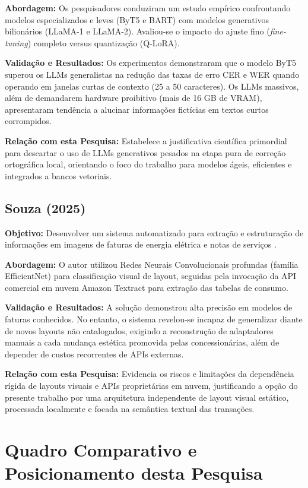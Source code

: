 \documentclass[
	12pt,				
	openright,			
	oneside,			
	a4paper,			
	english,			
	brazil				
	]{abntex2}
\begin{document}
\textbf{Abordagem:} Os pesquisadores conduziram um estudo empírico confrontando modelos especializados e leves (ByT5 e BART) \cite{xue2021byt5, lewis2020bart} com modelos generativos bilionários (LLaMA-1 e LLaMA-2). Avaliou-se o impacto do ajuste fino (\textit{fine-tuning}) completo versus quantização (Q-LoRA).

\textbf{Validação e Resultados:} Os experimentos demonstraram que o modelo ByT5 superou os LLMs generalistas na redução das taxas de erro CER e WER quando operando em janelas curtas de contexto (25 a 50 caracteres). Os LLMs massivos, além de demandarem hardware proibitivo (mais de 16 GB de VRAM), apresentaram tendência a alucinar informações fictícias em textos curtos corrompidos.

\textbf{Relação com esta Pesquisa:} Estabelece a justificativa científica primordial para descartar o uso de LLMs generativos pesados na etapa pura de correção ortográfica local, orientando o foco do trabalho para modelos ágeis, eficientes e integrados a bancos vetoriais.

\subsection{Souza (2025)}
\textbf{Objetivo:} Desenvolver um sistema automatizado para extração e estruturação de informações em imagens de faturas de energia elétrica e notas de serviços \cite{souza2025extracao}.

\textbf{Abordagem:} O autor utilizou Redes Neurais Convolucionais profundas (família EfficientNet) para classificação visual de layout, seguidas pela invocação da API comercial em nuvem Amazon Textract para extração das tabelas de consumo.

\textbf{Validação e Resultados:} A solução demonstrou alta precisão em modelos de faturas conhecidos. No entanto, o sistema revelou-se incapaz de generalizar diante de novos layouts não catalogados, exigindo a reconstrução de adaptadores manuais a cada mudança estética promovida pelas concessionárias, além de depender de custos recorrentes de APIs externas.

\textbf{Relação com esta Pesquisa:} Evidencia os riscos e limitações da dependência rígida de layouts visuais e APIs proprietárias em nuvem, justificando a opção do presente trabalho por uma arquitetura independente de layout visual estático, processada localmente e focada na semântica textual das transações.

\section{Quadro Comparativo e Posicionamento desta Pesquisa}
\label{sec:rel_quadro_comparativo}
\end{document}
